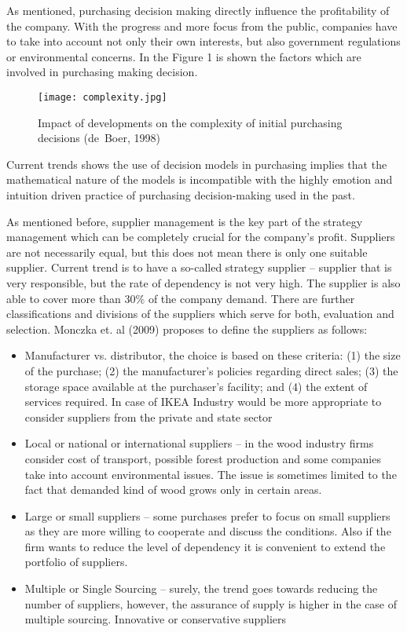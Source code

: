 \documentclass[oneside,12pt]{article}%
\begin{document}
As mentioned, purchasing decision making directly influence the profitability of the company. With the progress and more focus from the public, companies have to take into account not only their own interests, but also government regulations or environmental concerns. In the Figure 1 is shown the factors which are involved in purchasing making decision.

\begin{figure}[ht!]
  \texttt{[image: complexity.jpg]}
  \caption{Impact of developments on the complexity of initial purchasing decisions (de~Boer, 1998)}
\end{figure}

Current trends shows the use of decision models in purchasing implies that the mathematical nature of the models is incompatible with the highly emotion and intuition driven practice of purchasing decision-making used in the past.

As mentioned before, supplier management is the key part of the strategy management which can be completely crucial for the company’s profit. Suppliers are not necessarily equal, but this does not mean there is only one suitable supplier. Current trend is to have a so-called strategy supplier – supplier that is very responsible, but the rate of dependency is not very high. The supplier is also able to cover more than 30\% of the company demand.
There are further classifications and divisions of the suppliers which serve for both, evaluation and selection. Monczka et. al (2009) proposes to define the suppliers as follows:

\begin{itemize}
  \item Manufacturer vs. distributor, the choice is based on these criteria: (1) the size of the purchase; (2) the manufacturer’s policies regarding direct sales; (3) the storage space available at the purchaser’s facility; and (4) the extent of services required. In case of IKEA Industry would be more appropriate to consider suppliers from the private and state sector
  \item Local or national or international suppliers – in the wood industry firms consider cost of transport, possible forest production and some companies take into account environmental issues. The issue is sometimes limited to the fact that demanded kind of wood grows only in certain areas.
  \item Large or small suppliers – some purchases prefer to focus on small suppliers as they are more willing to cooperate and discuss the conditions. Also if the firm wants to reduce the level of dependency it is convenient to extend the portfolio of suppliers.
  \item Multiple or Single Sourcing – surely, the trend goes towards reducing the number of suppliers, however, the assurance of supply is higher in the case of multiple sourcing.
  Innovative or conservative suppliers
\end{itemize}
\end{document}
